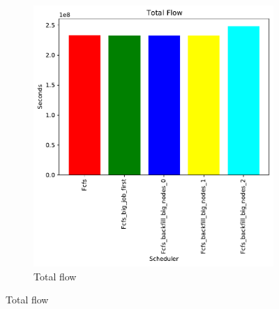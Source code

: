 \documentclass[a4paper]{article}
\begin{document}
\begin{figure}[H]
	\begin{subfigure}[b]{0.4\linewidth}\centering\includegraphics[width=1\linewidth]{MBSS/plot/Size_Constraint_2022-03-26->2022-03-26_classic_Total_flow_95_128_4_256_1_1024.pdf}\caption{Total flow}\end{subfigure}

\end{figure}
\end{document}
